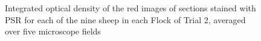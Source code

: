 %

\begin{figure}[p]
\centering
  \caption{Integrated optical density of the red images of sections stained with PSR for each of the nine sheep in each Flock of Trial 2, averaged over five microscope fields}
\vfill
  \label{fig:redpixt2}
\end{figure}

%

